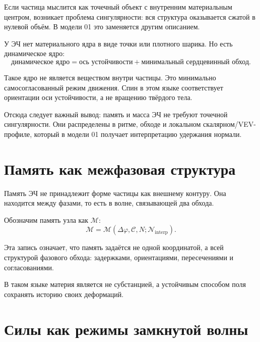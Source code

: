\documentclass[11pt,a4paper]{article}
\newcommand{\phase}{\varphi}
\newcommand{\normal}{\mathcal{N}}
\newcommand{\memory}{\mathcal{M}}
\newcommand{\contour}{\mathcal{C}}
\begin{document}
Если частица мыслится как точечный объект с внутренним материальным центром, возникает проблема сингулярности: вся структура оказывается сжатой в нулевой объём. В модели 01 это заменяется другим описанием.

У ЭЧ нет материального ядра в виде точки или плотного шарика. Но есть динамическое ядро:
\begin{equation}
\text{динамическое ядро} = \text{ось устойчивости} + \text{минимальный сердцевинный обход}.
\end{equation}

Такое ядро не является веществом внутри частицы. Это минимально самосогласованный режим движения. Спин в этом языке соответствует ориентации оси устойчивости, а не вращению твёрдого тела.

Отсюда следует важный вывод: память и масса ЭЧ не требуют точечной сингулярности. Они распределены в ритме, обходе и локальном скалярном/VEV-профиле, который в модели 01 получает интерпретацию удержания нормали.

\section{Память как межфазовая структура}

Память ЭЧ не принадлежит форме частицы как внешнему контуру. Она находится между фазами, то есть в волне, связывающей два обхода.

Обозначим память узла как $\memory$:
\begin{equation}
\memory = \memory(\Delta\phase, \contour, N; \normal_{\mathrm{interp}}).
\end{equation}

Эта запись означает, что память задаётся не одной координатой, а всей структурой фазового обхода: задержками, ориентациями, пересечениями и согласованиями.

В таком языке материя является не субстанцией, а устойчивым способом поля сохранять историю своих деформаций.

\section{Силы как режимы замкнутой волны}
\end{document}
